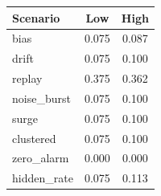 \begin{tabular}{lcc}
\toprule
Scenario & Low & High \\
\midrule
bias & 0.075 & 0.087 \\
drift & 0.075 & 0.100 \\
replay & 0.375 & 0.362 \\
noise\_burst & 0.075 & 0.100 \\
surge & 0.075 & 0.100 \\
clustered & 0.075 & 0.100 \\
zero\_alarm & 0.000 & 0.000 \\
hidden\_rate & 0.075 & 0.113 \\
\bottomrule
\end{tabular}
